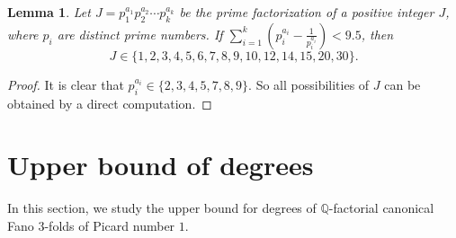 \documentclass[12pt,twoside]{amsart}
\newtheorem{lem}[thm]{Lemma}
\theoremstyle{definition}
\newtheorem{rem}[thm]{Remark}
\begin{document}
\begin{lem}\label{lem J<9.5}
 Let $J=p_1^{a_1}p_2^{a_2}\cdots p_k^{a_k}$ be the prime factorization of a positive integer $J$, where $p_i$ are distinct prime numbers.
 If $ \sum_{i=1}^k(p_i^{a_i}-\frac{1}{p_i^{a_i}})<9.5$,
 then
 \[J\in \{1,2,3,4,5,6,7,8,9,10,12,14,15,20,30\}.\]
\end{lem}

\begin{proof}
 It is clear that $p_i^{a_i}\in \{2,3,4,5,7,8,9\}$. So all possibilities of $J$ can be obtained by a direct computation.
\end{proof}

 
 


 
 \section{Upper bound of degrees}

In this section, we study the upper bound for degrees of $\mathbb Q$-factorial canonical Fano $3$-folds of Picard number $1$. 
\end{document}
